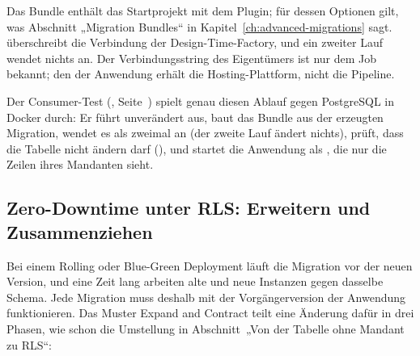 
Das Bundle enthält das Startprojekt mit dem Plugin; für dessen Optionen gilt, was
Abschnitt „Migration Bundles“ in Kapitel~\ref{ch:advanced-migrations} sagt.
 überschreibt die Verbindung der Design-Time-Factory, und ein zweiter Lauf
wendet nichts an. Der Verbindungsstring des Eigentümers ist nur dem Job  bekannt; den der
Anwendung erhält die Hosting-Plattform, nicht die Pipeline.

Der Consumer-Test (, Seite~\pageref{sec:consumer-test}) spielt genau diesen Ablauf gegen PostgreSQL in Docker durch: Er führt
 unverändert aus, baut das Bundle aus der
erzeugten Migration, wendet es als  zweimal an (der zweite Lauf
ändert nichts), prüft, dass  die Tabelle nicht ändern darf
(), und startet die Anwendung als , die nur
die Zeilen ihres Mandanten sieht.

\subsection*{Zero-Downtime unter RLS: Erweitern und Zusammenziehen}

Bei einem Rolling oder Blue-Green Deployment läuft die Migration vor der neuen Version, und
eine Zeit lang arbeiten alte und neue Instanzen gegen dasselbe Schema. Jede Migration muss
deshalb mit der Vorgängerversion der Anwendung funktionieren. Das Muster Expand and Contract
teilt eine Änderung dafür in drei Phasen, wie schon die Umstellung in
Abschnitt~„Von der Tabelle ohne Mandant zu RLS“:

